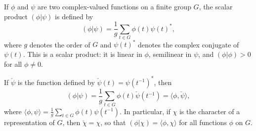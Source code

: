 If $\phi$ and $\psi$ are two complex-valued functions on a finite group $G$, the scalar product $(\phi|\psi)$ is defined by
$$(\phi|\psi) = \frac{1}{g} \sum_{t \in G} \phi(t)\psi(t)^*,$$
where $g$ denotes the order of $G$ and $\psi(t)^*$ denotes the complex conjugate of $\psi(t)$. This is a scalar product: it is linear in $\phi$, semilinear in $\psi$, and $(\phi|\phi) > 0$ for all $\phi \neq 0$.

If $\check{\psi}$ is the function defined by $\check{\psi}(t) = \psi(t^{-1})^*$, then
$$(\phi|\psi) = \frac{1}{g} \sum_{t \in G} \phi(t)\check{\psi}(t^{-1}) = \langle \phi, \check{\psi} \rangle,$$
where $\langle \phi, \psi \rangle = \frac{1}{g} \sum_{t \in G} \phi(t)\psi(t^{-1})$. In particular, if $\chi$ is the character of a representation of $G$, then $\check{\chi} = \chi$, so that $(\phi|\chi) = \langle \phi, \chi \rangle$ for all functions $\phi$ on $G$.